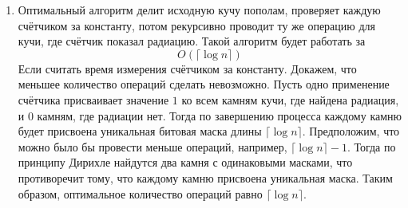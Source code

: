 \documentclass{article}
\begin{document}
\begin{enumerate}
    \item Оптимальный алгоритм делит исходную
          кучу пополам, проверяет каждую счётчиком за константу,
          потом рекурсивно проводит ту же операцию для
          кучи, где счётчик показал радиацию. Такой алгоритм
          будет работать за 
          \[ 
          O(\lceil \log n \rceil)
          \]
          Если считать время
          измерения счётчиком за константу.
          Докажем, что меньшее количество операций сделать
          невозможно. Пусть одно применение счётчика присваивает
          значение $1$ ко всем камням кучи, где найдена радиация,
          и $0$ камням, где радиации нет. Тогда по завершению
          процесса каждому камню будет присвоена уникальная
          битовая маска длины $\lceil \log n \rceil$.
          Предположим, что можно было бы провести меньше
          операций, например, $\lceil \log n \rceil - 1$.
          Тогда по принципу Дирихле найдутся два камня с одинаковыми
          масками, что противоречит тому, что каждому камню
          присвоена уникальная маска. Таким образом,
          оптимальное количество операций равно $\lceil \log n \rceil$.
\end{enumerate}
\end{document}

